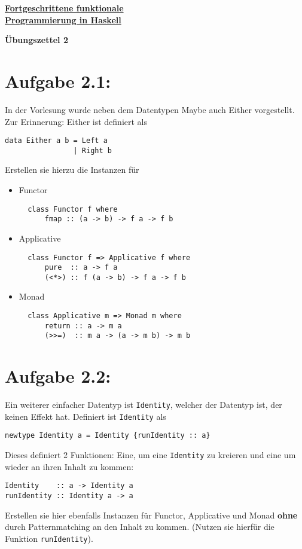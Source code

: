\documentclass[a4paper,10pt]{scrartcl}
\newcommand{\underfat}[1]{\underline{\textbf{#1}}}
\newcommand{\theuebungszettel}{2}
\begin{document}
\begin{center}
  \begin{huge}
    \underfat{Fortgeschrittene funktionale}\\
    \underfat{Programmierung in Haskell}\\
  \end{huge}
\begin{LARGE}
\textbf{Übungszettel \theuebungszettel}
\end{LARGE}
\end{center}
\section*{Aufgabe \theuebungszettel.1:}
In der Vorlesung wurde neben dem Datentypen Maybe auch Either vorgestellt. Zur Erinnerung: Either ist definiert als
\begin{verbatim}
data Either a b = Left a
                | Right b
\end{verbatim}
Erstellen sie hierzu die Instanzen für
\begin{itemize}
 \item Functor
       \begin{verbatim}
  class Functor f where
      fmap :: (a -> b) -> f a -> f b
       \end{verbatim}
 \item Applicative
       \begin{verbatim}
  class Functor f => Applicative f where
      pure  :: a -> f a
      (<*>) :: f (a -> b) -> f a -> f b
       \end{verbatim}
 \item Monad
       \begin{verbatim}
  class Applicative m => Monad m where
      return :: a -> m a
      (>>=)  :: m a -> (a -> m b) -> m b
       \end{verbatim}
\end{itemize}
\section*{Aufgabe \theuebungszettel.2:}
Ein weiterer einfacher Datentyp ist \texttt{Identity}, welcher der Datentyp ist, der keinen Effekt hat. Definiert ist \texttt{Identity} als
\begin{verbatim}
newtype Identity a = Identity {runIdentity :: a}
\end{verbatim}
Dieses definiert 2 Funktionen: Eine, um eine \texttt{Identity} zu kreieren und eine um wieder an ihren Inhalt zu kommen:
\begin{verbatim}
Identity    :: a -> Identity a
runIdentity :: Identity a -> a
\end{verbatim}
Erstellen sie hier ebenfalls Instanzen für Functor, Applicative und Monad \textbf{ohne} durch Patternmatching an den Inhalt zu kommen. (Nutzen sie hierfür die Funktion \texttt{runIdentity}).
\end{document}
